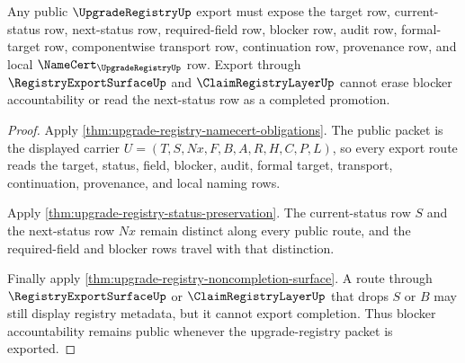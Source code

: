 \begin{theorem}
\label{thm:upgrade-registry-public-export}
Any public $\UpgradeRegistryUp$ export must expose the target row, current-status row, next-status row, required-field row, blocker row, audit row, formal-target row, componentwise transport row, continuation row, provenance row, and local $\NameCert_{\UpgradeRegistryUp}$ row. Export through $\RegistryExportSurfaceUp$ and $\ClaimRegistryLayerUp$ cannot erase blocker accountability or read the next-status row as a completed promotion.
\end{theorem}
\begin{proof}
Apply \autoref{thm:upgrade-registry-namecert-obligations}. The public packet is the displayed carrier $U=(T,S,Nx,F,B,A,R,H,C,P,L)$, so every export route reads the target, status, field, blocker, audit, formal target, transport, continuation, provenance, and local naming rows.

Apply \autoref{thm:upgrade-registry-status-preservation}. The current-status row $S$ and the next-status row $Nx$ remain distinct along every public route, and the required-field and blocker rows travel with that distinction.

Finally apply \autoref{thm:upgrade-registry-noncompletion-surface}. A route through $\RegistryExportSurfaceUp$ or $\ClaimRegistryLayerUp$ that drops $S$ or $B$ may still display registry metadata, but it cannot export completion. Thus blocker accountability remains public whenever the upgrade-registry packet is exported.
\end{proof}



